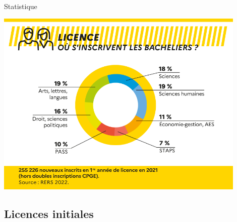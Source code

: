 \documentclass[usenames,dvipsnames,13pt,aspectratio=169]{beamer}
\begin{document}
\begin{frame}{Statistique}

	\begin{center}
	     \includegraphics[width=0.9\textwidth]{S13.png}
	\end{center}



\end{frame}



\subsection{Licences initiales}
\end{document}
